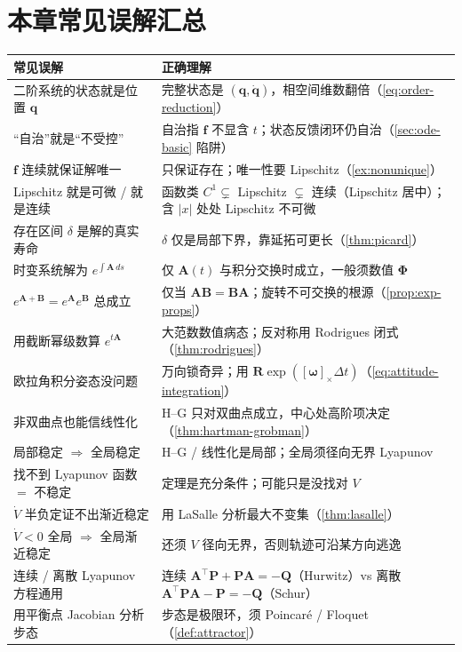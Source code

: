 \section*{本章常见误解汇总}
\begin{table}[H]\centering\small
\begin{tabular}{p{} p{}}
\toprule
\textbf{常见误解} & \textbf{正确理解} \\
\midrule
二阶系统的状态就是位置 $\mathbf{q}$ & 完整状态是 $(\mathbf{q},\dot{\mathbf{q}})$，相空间维数翻倍（\cref{eq:order-reduction}）\\
“自治”就是“不受控” & 自治指 $\mathbf{f}$ 不显含 $t$；状态反馈闭环仍自治（\cref{sec:ode-basic} 陷阱）\\
$\mathbf{f}$ 连续就保证解唯一 & 只保证存在；唯一性要 Lipschitz（\cref{ex:nonunique}）\\
Lipschitz 就是可微 / 就是连续 & 函数类 $C^1\subsetneq$ Lipschitz $\subsetneq$ 连续（Lipschitz 居中）；含 $|x|$ 处处 Lipschitz 不可微 \\
存在区间 $\delta$ 是解的真实寿命 & $\delta$ 仅是局部下界，靠延拓可更长（\cref{thm:picard}）\\
时变系统解为 $e^{\int\mathbf{A}\,ds}$ & 仅 $\mathbf{A}(t)$ 与积分交换时成立，一般须数值 $\boldsymbol{\Phi}$ \\
$e^{\mathbf{A}+\mathbf{B}}=e^{\mathbf{A}}e^{\mathbf{B}}$ 总成立 & 仅当 $\mathbf{A}\mathbf{B}=\mathbf{B}\mathbf{A}$；旋转不可交换的根源（\cref{prop:exp-props}）\\
用截断幂级数算 $e^{t\mathbf{A}}$ & 大范数数值病态；反对称用 Rodrigues 闭式（\cref{thm:rodrigues}）\\
欧拉角积分姿态没问题 & 万向锁奇异；用 $\mathbf{R}\exp([\boldsymbol{\omega}]_\times\Delta t)$（\cref{eq:attitude-integration}）\\
非双曲点也能信线性化 & H--G 只对双曲点成立，中心处高阶项决定（\cref{thm:hartman-grobman}）\\
局部稳定 $\Rightarrow$ 全局稳定 & H--G / 线性化是局部；全局须径向无界 Lyapunov \\
找不到 Lyapunov 函数 $=$ 不稳定 & 定理是充分条件；可能只是没找对 $V$ \\
$\dot V$ 半负定证不出渐近稳定 & 用 LaSalle 分析最大不变集（\cref{thm:lasalle}）\\
$\dot V<0$ 全局 $\Rightarrow$ 全局渐近稳定 & 还须 $V$ 径向无界，否则轨迹可沿某方向逃逸 \\
连续 / 离散 Lyapunov 方程通用 & 连续 $\mathbf{A}^\top\mathbf{P}+\mathbf{P}\mathbf{A}=-\mathbf{Q}$（Hurwitz）vs 离散 $\mathbf{A}^\top\mathbf{P}\mathbf{A}-\mathbf{P}=-\mathbf{Q}$（Schur）\\
用平衡点 Jacobian 分析步态 & 步态是极限环，须 Poincaré / Floquet（\cref{def:attractor}）\\
\bottomrule
\end{tabular}
\end{table}

